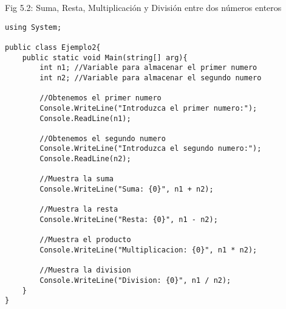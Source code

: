 \documentclass[11pt]{article} %
\begin{document}
Fig 5.2: Suma, Resta, Multiplicación y División entre dos números enteros
\begin{lstlisting}[frame=single]
using System;

public class Ejemplo2{
	public static void Main(string[] arg){
		int n1;	//Variable para almacenar el primer numero
		int n2;	//Variable para almacenar el segundo numero
		
		//Obtenemos el primer numero
		Console.WriteLine("Introduzca el primer numero:");
		Console.ReadLine(n1);
		
		//Obtenemos el segundo numero
		Console.WriteLine("Introduzca el segundo numero:");		
		Console.ReadLine(n2);
		
		//Muestra la suma
		Console.WriteLine("Suma: {0}", n1 + n2);
		
		//Muestra la resta		
		Console.WriteLine("Resta: {0}", n1 - n2);
		
		//Muestra el producto		
		Console.WriteLine("Multiplicacion: {0}", n1 * n2);
		
		//Muestra la division		
		Console.WriteLine("Division: {0}", n1 / n2);
	}
}
\end{lstlisting}
\end{document}
